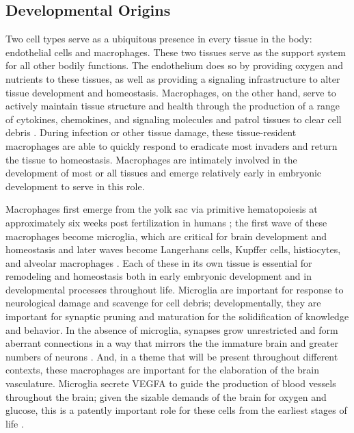\subsection{Developmental Origins}\label{macdev}

Two cell types serve as a ubiquitous presence in every tissue in the body: endothelial cells and macrophages. These two tissues serve as the support system for all other bodily functions. The endothelium does so by providing oxygen and nutrients to these tissues, as well as providing a signaling infrastructure to alter tissue development and homeostasis. Macrophages, on the other hand, serve to actively maintain tissue structure and health through the production of a range of cytokines, chemokines, and signaling molecules and patrol tissues to clear cell debris \citep{Wynn2013}. During infection or other tissue damage, these tissue\hyp{}resident macrophages are able to quickly respond to eradicate most invaders and return the tissue to homeostasis. Macrophages are intimately involved in the development of most or all tissues and emerge relatively early in embryonic development to serve in this role.

Macrophages first emerge from the yolk sac via primitive hematopoiesis at approximately six weeks post fertilization in humans \citep{Geissmann2010, Yona2013, Feyaerts2022}; the first wave of these macrophages become microglia, which are critical for brain development and homeostasis and later waves become Langerhans cells, Kupffer cells, histiocytes, and alveolar macrophages \citep{Wynn2013, Lavin2015}. Each of these in its own tissue is essential for remodeling and homeostasis both in early embryonic development and in developmental processes throughout life. Microglia are important for response to neurological damage and scavenge for cell debris; developmentally, they are important for synaptic pruning and maturation for the solidification of knowledge and behavior. In the absence of microglia, synapses grow unrestricted and form aberrant connections in a way that mirrors the the immature brain and greater numbers of neurons \citep{Hammond2018}. And, in a theme that will be present throughout different contexts, these macrophages are important for the elaboration of the brain vasculature. Microglia secrete VEGFA to guide the production of blood vessels throughout the brain; given the sizable demands of the brain for oxygen and glucose, this is a patently important role for these cells from the earliest stages of life \citep{Dudiki2020}. 

